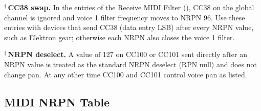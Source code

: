 {\small
\noindent$^{\dagger}$\,\textbf{CC38 swap.} In the \textcent{} entries of the Receive MIDI Filter
(), CC38 on the global channel is ignored and voice 1 filter frequency moves to
NRPN 96. Use these entries with devices that send CC38 (data entry LSB) after every NRPN value,
such as Elektron gear; otherwise each NRPN also closes the voice 1 filter.

\noindent$^{\ddagger}$\,\textbf{NRPN deselect.} A value of 127 on CC100 or CC101 sent directly
after an NRPN value is treated as the standard NRPN deselect (RPN null) and does not change pan.
At any other time CC100 and CC101 control voice pan as listed.
}

\subsection*{MIDI NRPN Table}

